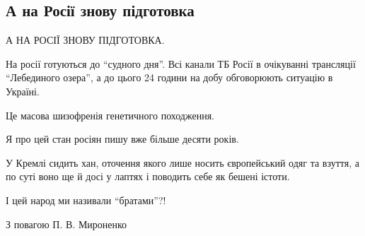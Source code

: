  
 
 
 
 

\subsection{А на Росії знову підготовка}
\label{sec:13_04_2021.fb.mironenko_petr.1.rossia_ukraina_bratja}

А НА РОСІЇ ЗНОВУ ПІДГОТОВКА.

На росії готуються до \enquote{судного дня}. Всі канали ТБ Росії в очікуванні
трансляції \enquote{Лебединого озера}, а до цього 24 години на добу обговорюють
ситуацію в Україні.

Це масова шизофренія генетичного походження. 

Я про цей стан росіян пишу вже більше десяти років. 

У Кремлі сидить хан, оточення якого лише носить європейський одяг та взуття, а
по суті воно ще й досі у лаптях і поводить себе як бешені істоти.

І цей народ ми називали \enquote{братами}?!

З повагою П. В. Мироненко
